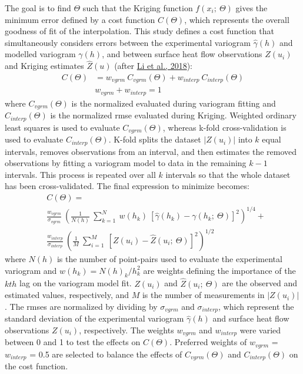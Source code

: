 The goal is to find \(\Theta\) such that the Kriging function \(f(x_i;\ \Theta)\) gives the minimum error defined by a cost function \(C(\Theta)\), which represents the overall goodness of fit of the interpolation. This study defines a cost function that simultaneously considers errors between the experimental variogram \(\hat{\gamma}(h)\) and modelled variogram \(\gamma(h)\), and between surface heat flow observations \(Z(u_i)\) and Kriging estimates \(\hat{Z}(u)\) (after \protect\hyperlink{ref-li2018}{Li et al., 2018}):
\begin{equation}
  \begin{aligned}
    C(\Theta) &= w_{vgrm}\ C_{vgrm}(\Theta) + w_{interp}\ C_{interp}(\Theta) \\
    &w_{vgrm} + w_{interp} = 1
  \end{aligned}
  \label{eq:cost}
\end{equation}
where \(C_{vgrm}(\Theta)\) is the normalized  evaluated during variogram fitting and \(C_{interp}(\Theta)\) is the normalized \gls{rmse} evaluated during Kriging. Weighted ordinary least squares is used to evaluate \(C_{vgrm}(\Theta)\), whereas k-fold cross-validation is used to evaluate \(C_{interp}(\Theta)\). K-fold splits the dataset \(|Z(u_i)|\) into \(k\) equal intervals, removes observations from an interval, and then estimates the removed observations by fitting a variogram model to data in the remaining \(k-1\) intervals. This process is repeated over all \(k\) intervals so that the whole dataset has been cross-validated. The final expression to minimize becomes:
\begin{equation}
  \begin{aligned}
    &C(\Theta) = \\
    &\frac{w_{vgrm}}{\sigma_{vgrm}}\ \left(\frac{1}{N(h)}\ \sum_{k=1}^{N}\ w(h_k)\ [\hat{\gamma}(h_k)-\gamma(h_k;\ \Theta)]^2\right)^{1/4} + \\
    &\frac{w_{interp}}{\sigma_{interp}}\ \left(\frac{1}{M}\ \sum_{i=1}^{M}\ [Z(u_i)-\hat{Z}(u_i;\ \Theta)]^2\right)^{1/2}
  \end{aligned}
  \label{eq:costExp}
\end{equation}
where \(N(h)\) is the number of point-pairs used to evaluate the experimental variogram and \(w(h_k) = N(h)_k/h_k^2\) are weights defining the importance of the \(kth\) lag on the variogram model fit. \(Z(u_i)\) and \(\hat{Z}(u_i;\ \Theta)\) are the observed and estimated values, respectively, and \(M\) is the number of measurements in \(|Z(u_i)|\). The \glspl{rmse} are normalized by dividing by \(\sigma_{vgrm}\) and \(\sigma_{interp}\), which represent the standard deviation of the experimental variogram \(\hat{\gamma}(h)\) and surface heat flow observations \(Z(u_i)\), respectively. The weights \(w_{vgrm}\) and \(w_{interp}\) were varied between 0 and 1 to test the effects on \(C(\Theta)\). Preferred weights of \(w_{vgrm}\) = \(w_{interp}\) = 0.5 are selected to balance the effects of \(C_{vgrm}(\Theta)\) and \(C_{interp}(\Theta)\) on the cost function.


